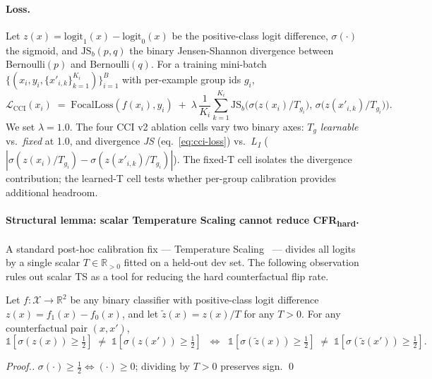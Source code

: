 \paragraph{Loss.}
Let $z(x) = \mathrm{logit}_1(x) - \mathrm{logit}_0(x)$ be the positive-class logit difference, $\sigma(\cdot)$ the sigmoid, and $\mathrm{JS}_b(p, q)$ the binary Jensen-Shannon divergence between Bernoulli$(p)$ and Bernoulli$(q)$. For a training mini-batch $\{(x_i, y_i, \{x'_{i,k}\}_{k=1}^{K_i})\}_{i=1}^{B}$ with per-example group ids $g_i$,
\begin{equation}
\mathcal{L}_{\text{CCI}}(x_i)
\;=\;
\mathrm{FocalLoss}(f(x_i), y_i)
\;+\;
\lambda \,\frac{1}{K_i}\sum_{k=1}^{K_i}
\mathrm{JS}_b\!\Big(\sigma\!\big(z(x_i) / T_{g_i}\big),\,
                     \sigma\!\big(z(x'_{i,k}) / T_{g_i}\big)\Big).
\label{eq:cci-loss}
\end{equation}
We set $\lambda = 1.0$. The four CCI v2 ablation cells vary two binary axes: $T_g$ \emph{learnable} vs.\ \emph{fixed} at 1.0, and divergence \emph{JS} (eq.~\ref{eq:cci-loss}) vs.\ \emph{L\textsubscript{1}} ($|\sigma(z(x_i)/T_{g_i}) - \sigma(z(x'_{i,k})/T_{g_i})|$). The fixed-T cell isolates the divergence contribution; the learned-T cell tests whether per-group calibration provides additional headroom.

\paragraph{Structural lemma: scalar Temperature Scaling cannot reduce CFR\textsubscript{hard}.}
\label{para:ts-cfr}
A standard post-hoc calibration fix --- Temperature Scaling~\citep{guo2017calibration} --- divides all logits by a single scalar $T \in \mathbb{R}_{>0}$ fitted on a held-out dev set. The following observation rules out scalar TS as a tool for reducing the hard counterfactual flip rate.

\begin{lemma}
\label{thm:ts-cfr}
Let $f : \mathcal{X} \to \mathbb{R}^2$ be any binary classifier with positive-class logit difference $z(x) = f_1(x) - f_0(x)$, and let $\tilde z(x) = z(x) / T$ for any $T > 0$. For any counterfactual pair $(x, x')$,
\begin{equation*}
\mathbb{1}[\sigma(z(x)) \ge \tfrac{1}{2}] \;\ne\; \mathbb{1}[\sigma(z(x')) \ge \tfrac{1}{2}]
\;\;\Longleftrightarrow\;\;
\mathbb{1}[\sigma(\tilde z(x)) \ge \tfrac{1}{2}] \;\ne\; \mathbb{1}[\sigma(\tilde z(x')) \ge \tfrac{1}{2}].
\end{equation*}
\end{lemma}
\begin{proof}[Proof.] $\sigma(\cdot) \ge \tfrac{1}{2} \iff (\cdot) \ge 0$; dividing by $T > 0$ preserves sign. \qed
\end{proof}

